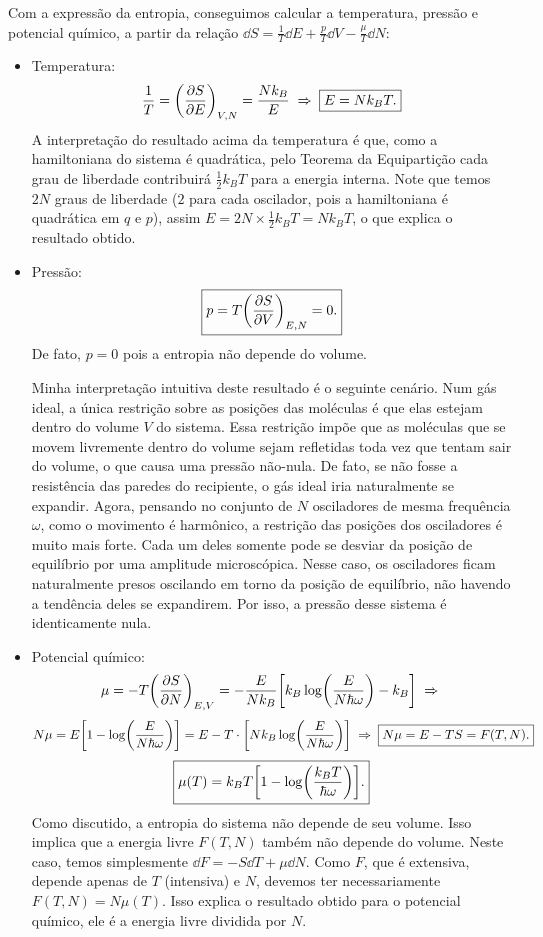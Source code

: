 \documentclass[a4paper,10pt]{article}
\begin{document}
Com a expressão da entropia, conseguimos calcular a temperatura, pressão e potencial químico, a partir da relação $\dd{S} = \frac{1}{T} \dd{E} + \frac{p}{T} \dd{V} - \frac{\mu}{T} \dd{N}$:
\begin{itemize}
\item Temperatura:
$$
\frac{1}{T} = \qty(\pdv{S}{E})_{V,N} = \frac{N k_B}{E} \; \Rightarrow \; \boxed{ E = N k_B T. }
$$
A interpretação do resultado acima da temperatura é que, como a hamiltoniana do sistema é quadrática, pelo Teorema da Equipartição cada grau de liberdade contribuirá $\frac{1}{2} k_B T$ para a energia interna. Note que temos $2N$ graus de liberdade ($2$ para cada oscilador, pois a hamiltoniana é quadrática em $q$ e $p$), assim $E = 2N \times \frac{1}{2} k_B T = N k_B T$, o que explica o resultado obtido.

\n

\item Pressão:
$$
\boxed{ p = T \qty(\pdv{S}{V})_{E,N} = 0. }
$$
De fato, $p = 0$ pois a entropia não depende do volume.

\n

Minha interpretação intuitiva deste resultado é o seguinte cenário. Num gás ideal, a única restrição sobre as posições das moléculas é que elas estejam dentro do volume $V$ do sistema. Essa restrição impõe que as moléculas que se movem livremente dentro do volume sejam refletidas toda vez que tentam sair do volume, o que causa uma pressão não-nula. De fato, se não fosse a resistência das paredes do recipiente, o gás ideal iria naturalmente se expandir. Agora, pensando no conjunto de $N$ osciladores de mesma frequência $\omega$, como o movimento é harmônico, a restrição das posições dos osciladores é muito mais forte. Cada um deles somente pode se desviar da posição de equilíbrio por uma amplitude microscópica. Nesse caso, os osciladores ficam naturalmente presos oscilando em torno da posição de equilíbrio, não havendo a tendência deles se expandirem. Por isso, a pressão desse sistema é identicamente nula.

\n

\item Potencial químico:
$$
\mu = - T \qty(\pdv{S}{N})_{E,V} = -\frac{E}{N k_B} \qty[k_B \log(\frac{E}{N\hbar\omega}) - k_B] \; \Rightarrow \;
$$
$$
N \mu = E \qty[1 - \log(\frac{E}{N\hbar\omega})] = E - T \cdot \qty[N k_B \log(\frac{E}{N\hbar\omega})] \; \Rightarrow \;
\boxed{ N \mu = E - TS = F(T, N). }
$$
$$
\boxed{ \mu(T) = k_B T \qty[1-\log(\frac{k_B T}{\hbar\omega})]. }
$$
Como discutido, a entropia do sistema não depende de seu volume. Isso implica que a energia livre $F(T,N)$ também não depende do volume. Neste caso, temos simplesmente $\dd{F} = -S \dd{T} + \mu \dd{N}$. Como $F$, que é extensiva, depende apenas de $T$ (intensiva) e $N$, devemos ter necessariamente $F(T,N) = N \mu(T)$. Isso explica o resultado obtido para o potencial químico, ele é a energia livre dividida por $N$.
\end{itemize}
\end{document}
